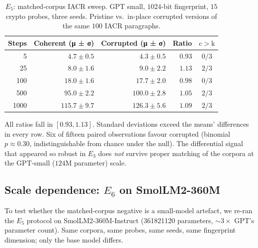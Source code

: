 \documentclass[11pt,a4paper]{article}
\begin{document}
\begin{table}[h]
  \centering
  \caption{$E_5$: matched\nobreakdash-corpus IACR sweep.
    GPT small, $1024$\nobreakdash-bit fingerprint, $15$
    crypto probes, three seeds.  Pristine vs.\ in\nobreakdash-place
    corrupted versions of the same $100$ IACR paragraphs.}
  \label{tab:poisoning:matched}
  \begin{tabular}{r r r r c}
    \toprule
    \textbf{Steps} & \textbf{Coherent (μ ± σ)} & \textbf{Corrupted (μ ± σ)} & \textbf{Ratio} & \textbf{$\mathrm{c}>\mathrm{k}$} \\
    \midrule
       5 &   $4.7 \pm 0.5$ &   $4.3 \pm 0.5$ & $0.93$ & $0/3$ \\
      25 &   $8.0 \pm 1.6$ &   $9.0 \pm 2.2$ & $1.13$ & $2/3$ \\
     100 &  $18.0 \pm 1.6$ &  $17.7 \pm 2.0$ & $0.98$ & $0/3$ \\
     500 &  $95.0 \pm 2.2$ & $100.0 \pm 2.8$ & $1.05$ & $2/3$ \\
    1000 & $115.7 \pm 9.7$ & $126.3 \pm 5.6$ & $1.09$ & $2/3$ \\
    \bottomrule
  \end{tabular}
\end{table}

All ratios fall in $[0.93, 1.13]$.  Standard deviations exceed
the means' differences in every row.  Six of fifteen paired
observations favour corrupted (binomial $p \approx 0.30$,
indistinguishable from chance under the null).  The differential
signal that appeared so robust in $E_3$ does \emph{not} survive
proper matching of the corpora at the GPT\nobreakdash-small
($124$M parameter) scale.

\subsection{Scale dependence: $E_6$ on SmolLM2\nobreakdash-360M}
\label{sec:poisoning:scale}

To test whether the matched\nobreakdash-corpus negative is a
small\nobreakdash-model artefact, we re\nobreakdash-ran the $E_5$
protocol on SmolLM2\nobreakdash-360M\nobreakdash-Instruct
(\num{361821120} parameters, $\sim\!3\!\times$ GPT's
parameter count).  Same corpora, same probes, same seeds, same
fingerprint dimension; only the base model differs.
\end{document}
